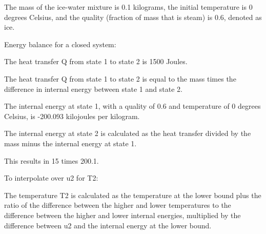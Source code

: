 The mass of the ice-water mixture is 0.1 kilograms, the initial temperature is 0 degrees Celsius, and the quality (fraction of mass that is steam) is 0.6, denoted as ice.

Energy balance for a closed system:

The heat transfer Q from state 1 to state 2 is 1500 Joules.

The heat transfer Q from state 1 to state 2 is equal to the mass times the difference in internal energy between state 1 and state 2.

The internal energy at state 1, with a quality of 0.6 and temperature of 0 degrees Celsius, is -200.093 kilojoules per kilogram.

The internal energy at state 2 is calculated as the heat transfer divided by the mass minus the internal energy at state 1.

This results in 15 times 200.1.

To interpolate over u2 for T2:

The temperature T2 is calculated as the temperature at the lower bound plus the ratio of the difference between the higher and lower temperatures to the difference between the higher and lower internal energies, multiplied by the difference between u2 and the internal energy at the lower bound.